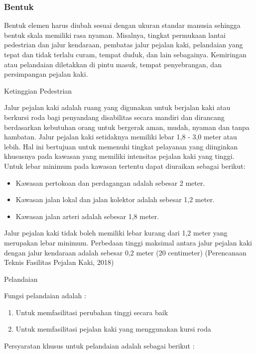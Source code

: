 \documentclass[../rumukota.tex]{subfiles}
\begin{document}
\subsubsection{Bentuk}%
\label{ssub:bentuk}

Bentuk elemen harus diubah sesuai dengan ukuran standar manusia sehingga bentuk skala memiliki rasa nyaman. Misalnya, tingkat permukaan lantai pedestrian dan jalur kendaraan, pembatas jalur pejalan kaki, pelandaian yang tepat dan tidak terlalu curam, tempat duduk, dan lain sebagainya. Kemiringan atau pelandaian diletakkan di pintu masuk, tempat penyebrangan, dan persimpangan pejalan kaki.

\tabitem Ketinggian Pedestrian

Jalur pejalan kaki adalah ruang yang digunakan untuk berjalan kaki atau berkursi roda bagi penyandang disabilitas secara mandiri dan dirancang berdasarkan kebutuhan orang untuk bergerak aman, mudah, nyaman dan tanpa hambatan. Jalur pejalan kaki setidaknya memiliki lebar 1,8 - 3,0 meter atau lebih. Hal ini bertujuan untuk memenuhi tingkat pelayanan yang diinginkan khususnya pada kawasan yang memiliki intensitas pejalan kaki yang tinggi. Untuk lebar minimum pada kawasan tertentu dapat diuraikan sebagai berikut:

\begin{itemize}
	\item Kawasan pertokoan dan perdagangan adalah sebesar 2 meter.
	\item Kawasan jalan lokal dan jalan kolektor adalah sebesar 1,2 meter.
	\item Kawasan jalan arteri adalah sebesar 1,8 meter.
\end{itemize}

Jalur pejalan kaki tidak boleh memiliki lebar kurang dari 1,2 meter yang merupakan lebar minimum. Perbedaan tinggi maksimal antara jalur pejalan kaki dengan jalur kendaraan adalah sebesar 0,2 meter (20 centimeter) (Perencanaan Teknis Fasilitas Pejalan Kaki, 2018)

\tabitem Pelandaian

Fungsi pelandaian adalah :

\begin{enumerate}
	\item Untuk memfasilitasi perubahan tinggi secara baik
	\item Untuk memfasilitasi pejalan kaki yang menggunakan kursi roda
\end{enumerate}
Persyaratan khusus untuk pelandaian adalah sebagai berikut :
\end{document}

